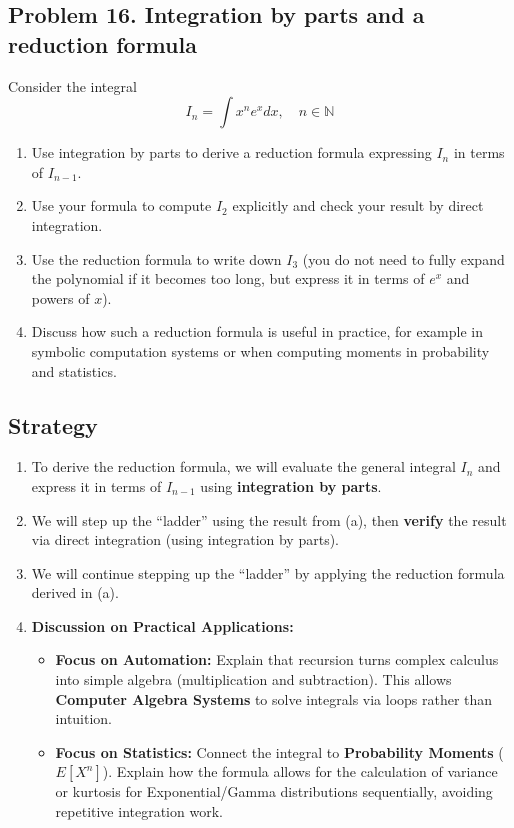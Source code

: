 \subsection{Problem 16. Integration by parts and a reduction formula}
Consider the integral
\[I_{n}=\displaystyle\int x^{n}e^{x}dx, \quad n\in\mathbb{N}\]

\begin{enumerate}[label=(\alph*)]
    \item Use integration by parts to derive a reduction formula expressing $I_{n}$ in terms of $I_{n-1}$.
    \item Use your formula to compute $I_{2}$ explicitly and check your result by direct integration.
    \item Use the reduction formula to write down $I_{3}$ (you do not need to fully expand the polynomial if it becomes too long, but express it in terms of $e^{x}$ and powers of $x$).
    \item Discuss how such a reduction formula is useful in practice, for example in symbolic computation systems or when computing moments in probability and statistics.
\end{enumerate}

\subsection*{Strategy}


\begin{enumerate}
    \item[(a)] To derive the reduction formula, we will evaluate the general integral $I_n$ and express it in terms of $I_{n-1}$ using \textbf{integration by parts}.
    
    \item[(b)] We will step up the ``ladder'' using the result from (a), then \textbf{verify} the result via direct integration (using integration by parts).
    
    \item[(c)] We will continue stepping up the ``ladder'' by applying the reduction formula derived in (a).
    
    \item[(d)] \textbf{Discussion on Practical Applications:}
    \begin{itemize}
        \item \textbf{Focus on Automation:} Explain that recursion turns complex calculus into simple algebra (multiplication and subtraction). This allows \textbf{Computer Algebra Systems} to solve integrals via loops rather than intuition.
        
        \item \textbf{Focus on Statistics:} Connect the integral to \textbf{Probability Moments} ($E[X^n]$). Explain how the formula allows for the calculation of variance or kurtosis for Exponential/Gamma distributions sequentially, avoiding repetitive integration work.
    \end{itemize}
\end{enumerate}
